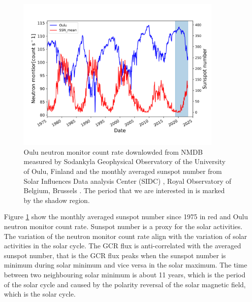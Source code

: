 \begin{figure}
	\centering
	\includegraphics[width = 0.9\textwidth]{images/Solar_modulation.png}
	\caption[Sunspot number and Neutron monitor count data]{Oulu neutron monitor count rate downlowded from \ac{NMDB} \footnotemark[1] measured by Sodankyla Geophysical Observatory of the University of Oulu, Finland and the monthly averaged sunspot number from Solar Influences Data analysis Center (SIDC) \footnotemark[2], Royal Observatory of Belgium, Brussels . The period that we are interested in is marked by the shadow region.}
	\label{Fig:Solar_modulation}
\end{figure}


Figure \ref{Fig:Solar_modulation} show the monthly averaged sunspot number since 1975 in red and Oulu neutron monitor count rate.
Sunspot number is a proxy for the solar activities. The variation of the neutron monitor count rate align with the variation of solar activities in the solar cycle.
The GCR flux is anti-correlated with the averaged sunspot number, that is the GCR flux peaks when the sunspot number is minimum during solar minimum and vice versa in the solar maximum.
The time between two neighbouring solar minimum is about 11 years, which is the period of the solar cycle and caused by the polarity reversal of the solar magnetic field, which is the solar cycle.

